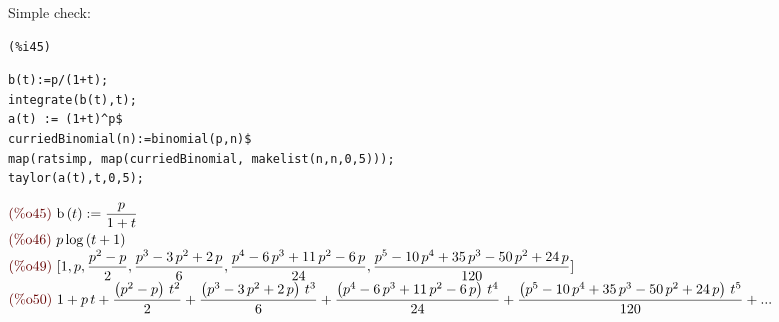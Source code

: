 Simple check:


\noindent
\begin{minipage}[t]{8ex}{\color{red}\bf
\begin{verbatim}
(%i45) 
\end{verbatim}}
\end{minipage}
\begin{minipage}[t]{\textwidth}{\color{blue}
\begin{verbatim}
b(t):=p/(1+t);
integrate(b(t),t);
a(t) := (1+t)^p$
curriedBinomial(n):=binomial(p,n)$
map(ratsimp, map(curriedBinomial, makelist(n,n,0,5)));
taylor(a(t),t,0,5);
\end{verbatim}}
\end{minipage}
\begin{math}\displaystyle
\parbox{8ex}{\color{labelcolor}(\%o45) }
\mathrm{b}\left( t\right) :=\frac{p}{1+t}
\end{math}\\
\begin{math}\displaystyle
\parbox{8ex}{\color{labelcolor}(\%o46) }
p\,\mathrm{log}\left( t+1\right) 
\end{math}\\
\begin{math}\displaystyle
\parbox{8ex}{\color{labelcolor}(\%o49) }
[1,p,\frac{{p}^{2}-p}{2},\frac{{p}^{3}-3\,{p}^{2}+2\,p}{6},\frac{{p}^{4}-6\,{p}^{3}+11\,{p}^{2}-6\,p}{24},\\\frac{{p}^{5}-10\,{p}^{4}+35\,{p}^{3}-50\,{p}^{2}+24\,p}{120}]
\end{math}\\
\begin{math}\displaystyle
\parbox{8ex}{\color{labelcolor}(\%o50) }
1+p\,t+\frac{\left( {p}^{2}-p\right) \,{t}^{2}}{2}+\frac{\left(
    {p}^{3}-3\,{p}^{2}+2\,p\right) \,{t}^{3}}{6}+\frac{\left(
    {p}^{4}-6\,{p}^{3}+11\,{p}^{2}-6\,p\right)
  \,{t}^{4}}{24}+\frac{\left(
    {p}^{5}-10\,{p}^{4}+35\,{p}^{3}-50\,{p}^{2}+24\,p\right)
  \,{t}^{5}}{120}+...
\end{math}










